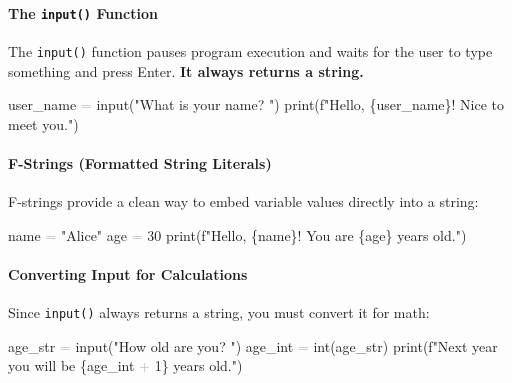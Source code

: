 \documentclass[
  justified,
  openright,
]{tufte-book}
\let\subsection\paragraph
\let\paragraph\paragraph
\newcommand{\StringTok}[1]{\textcolor{CodeString}{#1}}              %
\newcommand{\CodeNumTok}[1]{\textcolor{CodeNumber}{#1}}             %
\newcommand{\OperatorTok}[1]{\textcolor{DarkGray}{#1}}              %
\newenvironment{Shaded}{%
  \begin{mdframed}[style=TufteCode]%
}{%
  \end{mdframed}%
}
\let\subsection\paragraph
\let\paragraph\paragraph
\begin{document}
\subsection{\texorpdfstring{The \texttt{input()}
Function}{The input() Function}}\label{the-input-function}

The \texttt{input()} function pauses program execution and waits for the
user to type something and press Enter. \textbf{It always returns a
string.}

\begin{Shaded}
\begin{Highlighting}[]
user\_name \OperatorTok{=} input(\StringTok{"What is your name? "})
print(\StringTok{f"Hello, }\StringTok{\{}user\_name\StringTok{\}}\StringTok{! Nice to meet you."})
\end{Highlighting}
\end{Shaded}

\subsection{F-Strings (Formatted String
Literals)}\label{f-strings-formatted-string-literals}

F-strings provide a clean way to embed variable values directly into a
string:

\begin{Shaded}
\begin{Highlighting}[]
name \OperatorTok{=} \StringTok{"Alice"}
age \OperatorTok{=} \CodeNumTok{30}
print(\StringTok{f"Hello, }\StringTok{\{}name\StringTok{\}}\StringTok{! You are }\StringTok{\{}age\StringTok{\}}\StringTok{ years old."})
\end{Highlighting}
\end{Shaded}

\subsection{Converting Input for
Calculations}\label{converting-input-for-calculations}

Since \texttt{input()} always returns a string, you must convert it for
math:

\begin{Shaded}
\begin{Highlighting}[]
age\_str \OperatorTok{=} input(\StringTok{"How old are you? "})
age\_int \OperatorTok{=} int(age\_str)
print(\StringTok{f"Next year you will be }\StringTok{\{}age\_int \OperatorTok{+} \CodeNumTok{1}\StringTok{\}}\StringTok{ years old."})
\end{Highlighting}
\end{Shaded}
\end{document}

